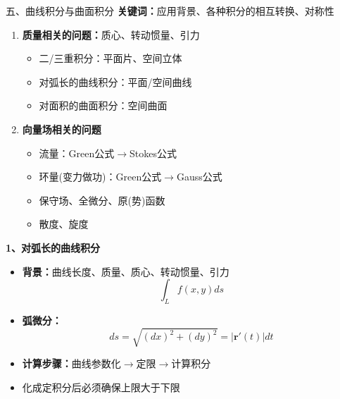 \begin{frame}{五、曲线积分与曲面积分}
	\linespread{1.2}\pause 
	{\b{\bf 关键词：}\pause 应用背景、\pause 各种积分的相互转换、\pause 对称性}\pause 
	
	\begin{enumerate}
	  \item {\bf 质量相关的问题：}\pause 质心、转动惯量、引力\pause 
	  \begin{itemize}
	    \item 二/三重积分：平面片、空间立体\pause 
	    \item 对弧长的曲线积分：平面/空间曲线\pause 
	    \item 对面积的曲面积分：空间曲面\pause 
	  \end{itemize}
	  \item {\bf 向量场相关的问题}\pause 
	  \begin{itemize}
	    \item 流量：Green公式$\to$Stokes公式\pause 
	    \item 环量(变力做功)：Green公式$\to$Gauss公式\pause 
	    \item 保守场、全微分、原(势)函数\pause 
	    \item 散度、旋度\pause 
	  \end{itemize}
	\end{enumerate}
\end{frame}

\begin{frame}
	\linespread{1.2}
	{\bf 1、对弧长的曲线积分}\pause 
	\begin{itemize}
	  \item {\bf 背景：}曲线长度、质量、质心、转动惯量、引力\pause 
	 	$$\int_{L}f(x,y)ds$$\pause
	 	\vspace{-1em} 
	  \item {\bf 弧微分：}
		$$ds=\sqrt{(dx)^2+(dy)^2}=|\bm{r}'(t)|dt$$\pause
		\vspace{-1em} 
	  \item {\bf 计算步骤：}曲线参数化$\to$定限$\to$计算积分\pause 
	  \item {}\alert{化成定积分后必须确保上限大于下限}
	\end{itemize}
\end{frame}

